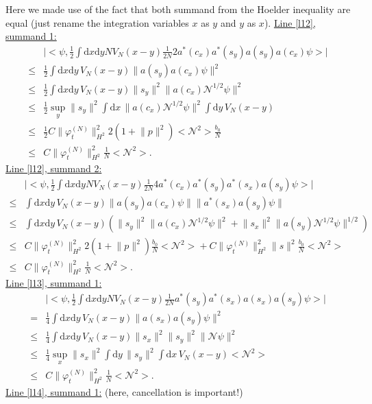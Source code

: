 \documentclass[11pt,a4paper]{scrartcl}
\newcommand{\di}{\textrm{d}}		%
\newcommand{\Ncal}{\mathcal{N}}		%
\newcommand{\estlist}[2]{\underline{Line \ref{l#1}, summand #2:}}
\newcommand{\scal}[2]{\big<#1,#2\big>} %
\newcommand{\norm}[1]{\lVert#1\rVert}	%
\newcommand{\ev}[1]{\big<#1\big>}	%
\newcommand{\ph}{\varphi_t^{(N)}}	%
\newcommand{\dxyNV}{\frac{1}{2}\int \di x\di y N V_N(x-y)} %
\begin{document}
Here we made use of the fact that both summand from the Hoelder inequality are equal (just rename the integration variables $x$ as $y$ and $y$ as $x$).\newline
\estlist{12}{1}
\begin{align*}
& \lvert \scal{\psi}{\dxyNV \frac{1}{2N}2a^\ast(c_x)a^\ast(s_y)a(s_y)a(c_x)\psi}\rvert \\
\leq & \frac{1}{2}\int \di x\di y\, V_N(x-y) \norm{a(s_y)a(c_x)\psi}^2 \\
\leq & \frac{1}{2}\int \di x\di y\, V_N(x-y) \norm{s_y}^2 \norm{a(c_x)\Ncal^{1/2}\psi}^2 \\
\leq & \frac{1}{2}\sup_y \norm{s_y}^2 \int \di x\, \norm{a(c_x)\Ncal^{1/2}\psi}^2 \int \di y\,V_N(x-y) \\
\leq & \frac{1}{2}C\norm{\ph}_{H^2}^2 2(1+\norm{p}^2)\ev{\Ncal^2} \frac{b_0}{N} \\
\leq & C \norm{\ph}_{H^2}^2 \frac{1}{N} \ev{\Ncal^2}.
\end{align*}
\estlist{12}{2}
\begin{align*}
 & \lvert \scal{\psi}{\dxyNV \frac{1}{2N} 4 a^\ast(c_x) a^\ast(s_y) a^\ast(s_x) a(s_y) \psi}\rvert \\
\leq & \int \di x\di y\, V_N(x-y) \norm{a(s_y)a(c_x)\psi}\norm{a^\ast(s_x)a(s_y)\psi} \\
\leq & \int \di x\di y\, V_N(x-y) \left( \norm{s_y}^2 \norm{a(c_x)\Ncal^{1/2}\psi}^2 + \norm{s_x}^2 \norm{a(s_y)\Ncal^{1/2}\psi}^{1/2}\right) \\
\leq & C \norm{\ph}_{H^2}^2 2(1+\norm{p}^2)\frac{b_0}{N}\ev{\Ncal^2} + C\norm{\ph}_{H^2}^2 \norm{s}^2 \frac{b_0}{N} \ev{\Ncal^2} \\
\leq & C\norm{\ph}_{H^2}^2 \frac{1}{N}\ev{\Ncal^2}.
\end{align*}
\estlist{13}{1}
\begin{align*}
& \lvert \scal{\psi}{\dxyNV \frac{1}{2N} a^\ast(s_y) a^\ast(s_x) a(s_x)a(s_y)\psi} \rvert \\
= & \frac{1}{4} \int \di x\di y\, V_N(x-y) \norm{a(s_x)a(s_y)\psi}^2 \\
\leq & \frac{1}{4} \int \di x\di y\, V_N(x-y) \norm{s_x}^2 \norm{s_y}^2 \norm{\Ncal\psi}^2 \\
\leq & \frac{1}{4} \sup_x \norm{s_x}^2 \int \di y\, \norm{s_y}^2 \int \di x\, V_N(x-y) \ev{\Ncal^2}\\
\leq & C\norm{\ph}_{H^2}^2 \frac{1}{N}\ev{\Ncal^2}.
\end{align*}
\estlist{14}{1} (here, cancellation is important!)
\end{document}
